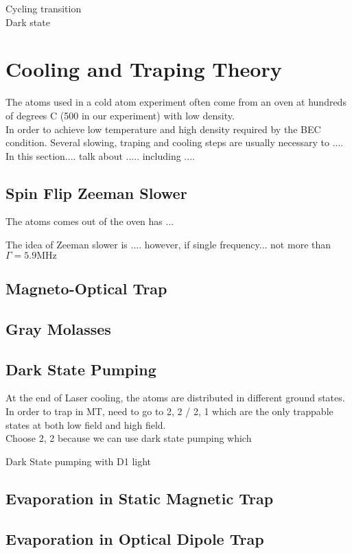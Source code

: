 
Cycling transition\\
Dark state

\section{Cooling and Traping Theory}
The atoms used in a cold atom experiment often come from an oven at hundreds of degrees C (500 in our experiment) with low density.\\
In order to achieve low temperature and high density required by the BEC condition. Several slowing, traping and cooling steps are usually necessary to ....\\
In this section.... talk about ..... including ....\\

\subsection{Spin Flip Zeeman Slower}

The atoms comes out of the oven has ...\\

The idea of Zeeman slower is .... however, if single frequency... not more than $\Gamma=5.9\text{MHz}$


\subsection{Magneto-Optical Trap}

\subsection{Gray Molasses}

\subsection{Dark State Pumping}
At the end of Laser cooling, the atoms are distributed in different ground states.\\
In order to trap in MT, need to go to 2, 2 / 2, 1 which are the only trappable states at both low field and high field.\\
Choose 2, 2 because we can use dark state pumping which

Dark State pumping with D1 light

\subsection{Evaporation in Static Magnetic Trap}

\subsection{Evaporation in Optical Dipole Trap}
